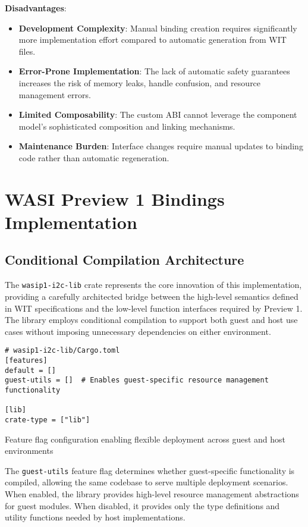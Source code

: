 \textbf{Disadvantages}:
\begin{itemize}
    \item \textbf{Development Complexity}: Manual binding creation requires significantly more implementation effort compared to automatic generation from WIT files.
    \item \textbf{Error-Prone Implementation}: The lack of automatic safety guarantees increases the risk of memory leaks, handle confusion, and resource management errors.
    \item \textbf{Limited Composability}: The custom ABI cannot leverage the component model's sophisticated composition and linking mechanisms.
    \item \textbf{Maintenance Burden}: Interface changes require manual updates to binding code rather than automatic regeneration.
\end{itemize}

\section{WASI Preview 1 Bindings Implementation}
\label{sec:wasip1-bindings}

\subsection{Conditional Compilation Architecture}

The \texttt{wasip1-i2c-lib} crate represents the core innovation of this implementation, providing a carefully architected bridge between the high-level semantics defined in WIT specifications and the low-level function interfaces required by Preview 1. The library employs conditional compilation to support both guest and host use cases without imposing unnecessary dependencies on either environment.

\begin{listing}[H]
\begin{verbatim}
# wasip1-i2c-lib/Cargo.toml
[features]
default = []
guest-utils = []  # Enables guest-specific resource management functionality

[lib]
crate-type = ["lib"]
\end{verbatim}
\caption{Feature flag configuration enabling flexible deployment across guest and host environments}
\label{lst:conditional-compilation}
\end{listing}

The \texttt{guest-utils} feature flag determines whether guest-specific functionality is compiled, allowing the same codebase to serve multiple deployment scenarios. When enabled, the library provides high-level resource management abstractions for guest modules. When disabled, it provides only the type definitions and utility functions needed by host implementations.

